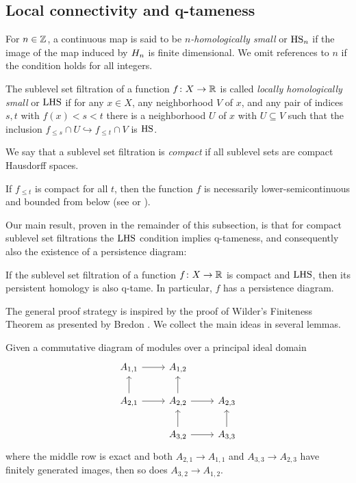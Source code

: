 \subsection{Local connectivity and q-tameness}

\begin{defi}
	For $n \in \mathbb{Z}$, a continuous map is said to be \emph{$n$-homologically small} or $\mathrm{HS}_n$ if the image of the map induced by $H_{n}$ is finite dimensional.
	We omit references to $n$ if the condition holds for all integers.
\end{defi}

\begin{defi}\label{defi:LHS}
	The sublevel set filtration of a function $f \colon X \to \mathbb{R}$ is called \emph{locally homologically small} or \emph{$\mathrm{LHS}$} if for any $x \in X$, any neighborhood $V$ of $x$, and any pair of indices $s,t$ with $f(x) < s < t$ there is a neighborhood $U$ of $x$ with $U \subseteq V$ such that the inclusion $f_{\leq s} \cap U \hookrightarrow f_{\leq t} \cap V$ is $\mathrm{HS}$.
\end{defi}

\begin{defi}
	We say that a sublevel set filtration is \emph{compact} if all sublevel sets are compact Hausdorff spaces.
\end{defi}

If $f_{\leq t}$ is compact for all $t$, then the function $f$ is necessarily lower-semicontinuous and bounded from below (see \cite[p.~444]{Morse.1939} or \cite[Theorem 3.1]{Struwe.1988}).

Our main result, proven in the remainder of this subsection, is that for compact sublevel set filtrations the $\mathrm{LHS}$ condition implies \mbox{q-tameness}, and consequently also the existence of a persistence diagram:

\begin{thm} \label{t:local connectedness implies q-tameness}
	If the sublevel set filtration of a function $f \colon X \to \mathbb{R}$ is compact and	$\mathrm{LHS}$, then its persistent homology is also q-tame.
	In particular, $f$ has a persistence diagram.
\end{thm}

The general proof strategy is inspired by the proof of Wilder's Finiteness Theorem \cite[p.~325]{Wilder.1949} as presented by Bredon \cite[Section II.17]{Bredon.1997}.
We collect the main ideas in several lemmas.

\begin{lem} \label{l:commutative algebra}
	Given a commutative diagram of modules over a principal ideal domain
	\begin{equation*}
	\begin{tikzcd}
	A_{1,1} \arrow[r] & A_{1,2} & \\
	A_{2,1} \arrow[r] \arrow[u] & A_{2,2} \arrow[r] \arrow[u] & A_{2,3} \\
	& A_{3,2} \arrow[r] \arrow[u] & A_{3,3} \arrow[u]
	\end{tikzcd}
	\end{equation*}
	where the middle row is exact and both $A_{2,1} \to A_{1,1}$ and $A_{3,3} \to A_{2,3}$ have finitely generated images, then so does $A_{3,2} \to A_{1,2}$.
\end{lem}

